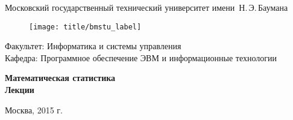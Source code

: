 
\thispagestyle{empty}

\begin{center}
	\Large
	Московский государственный технический университет имени~Н.\,Э.\,Баумана
\end{center}

\begin{figure}[h!]
	\begin{center}
		\texttt{[image: title/bmstu\_label]}
	\end{center}
\end{figure}

{\large
\noindent
Факультет: Информатика и системы управления\\[2mm]
\noindent
Кафедра: Программное обеспечение ЭВМ и информационные технологии\\[2mm]
\vspace{1.5cm}}

\begin{center}
	\Large
	\textbf{Математическая статистика\\ Лекции}
\end{center}
\vfill

\begin{center}
	Москва, 2015 г.
\end{center}